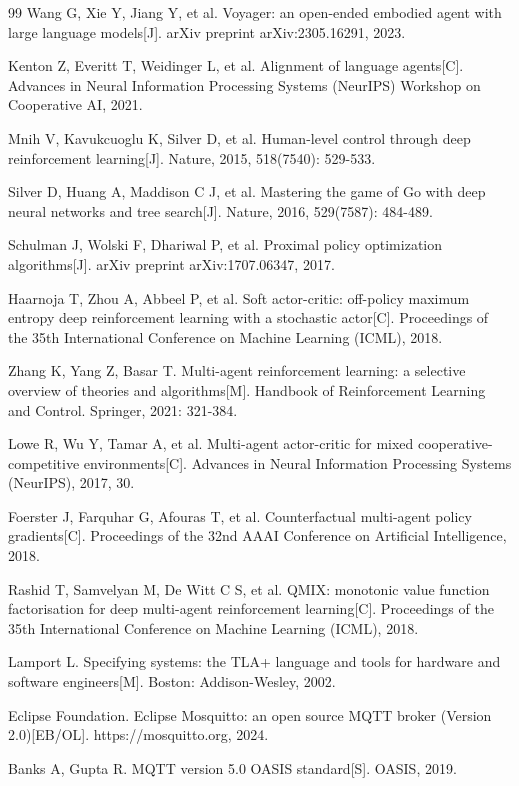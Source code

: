 \documentclass[12pt,a4paper]{ctexart}
\begin{document}
\begin{thebibliography}{99}
Wang G, Xie Y, Jiang Y, et al. Voyager: an open-ended embodied agent with large language models[J]. arXiv preprint arXiv:2305.16291, 2023.

Kenton Z, Everitt T, Weidinger L, et al. Alignment of language agents[C]. Advances in Neural Information Processing Systems (NeurIPS) Workshop on Cooperative AI, 2021.

Mnih V, Kavukcuoglu K, Silver D, et al. Human-level control through deep reinforcement learning[J]. Nature, 2015, 518(7540): 529-533.

Silver D, Huang A, Maddison C J, et al. Mastering the game of Go with deep neural networks and tree search[J]. Nature, 2016, 529(7587): 484-489.

Schulman J, Wolski F, Dhariwal P, et al. Proximal policy optimization algorithms[J]. arXiv preprint arXiv:1707.06347, 2017.

Haarnoja T, Zhou A, Abbeel P, et al. Soft actor-critic: off-policy maximum entropy deep reinforcement learning with a stochastic actor[C]. Proceedings of the 35th International Conference on Machine Learning (ICML), 2018.

Zhang K, Yang Z, Basar T. Multi-agent reinforcement learning: a selective overview of theories and algorithms[M]. Handbook of Reinforcement Learning and Control. Springer, 2021: 321-384.

Lowe R, Wu Y, Tamar A, et al. Multi-agent actor-critic for mixed cooperative-competitive environments[C]. Advances in Neural Information Processing Systems (NeurIPS), 2017, 30.

Foerster J, Farquhar G, Afouras T, et al. Counterfactual multi-agent policy gradients[C]. Proceedings of the 32nd AAAI Conference on Artificial Intelligence, 2018.

Rashid T, Samvelyan M, De Witt C S, et al. QMIX: monotonic value function factorisation for deep multi-agent reinforcement learning[C]. Proceedings of the 35th International Conference on Machine Learning (ICML), 2018.

Lamport L. Specifying systems: the TLA+ language and tools for hardware and software engineers[M]. Boston: Addison-Wesley, 2002.

Eclipse Foundation. Eclipse Mosquitto: an open source MQTT broker (Version 2.0)[EB/OL]. https://mosquitto.org, 2024.

Banks A, Gupta R. MQTT version 5.0 OASIS standard[S]. OASIS, 2019.

\end{thebibliography}
\end{document}
